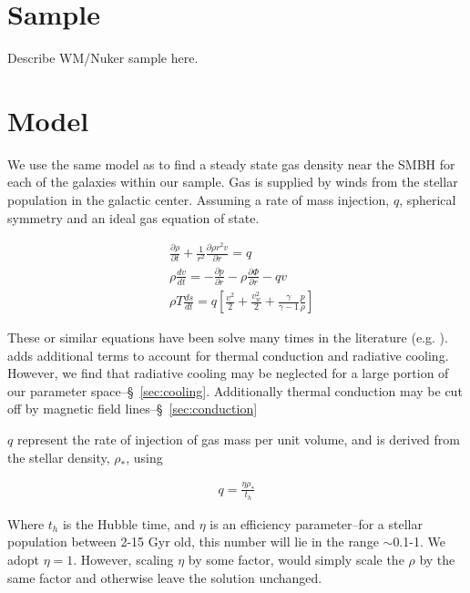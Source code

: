\documentclass[usenatbib,fleqn]{mn2e}
\newcommand{\dxdy}[2]{\frac{\partial #1}{\partial #2} }
\newcommand{\drhodt}{\dxdy{\rho}{t}}
\newcommand{\dpdr}{\dxdy{p}{r}}
\newcommand{\dphidr}{\dxdy{\Phi}{r}}
\newcommand{\ke}{\frac{v^2}{2}}
\newcommand{\kew}{\frac{v_w^2}{2}}
\newcommand{\gammaf}{\frac{\gamma}{\gamma-1}}
\newcommand{\cs}{\frac{p}{\rho}}
\begin{document}


\section{Sample}
Describe WM/Nuker sample here.

\section{Model}
We use the same model as \citealt{Quataert:2004a} to find a steady state gas density near the SMBH for each of the galaxies within our sample.  Gas is supplied by winds from the stellar population in the galactic center. Assuming a rate of mass injection, $q$, spherical symmetry and an ideal gas equation of state. 

\begin{align}
&\drhodt+\frac{1}{r^2}\dxdy{\rho r^2 v}{r}=q\\
&\rho \frac{dv}{dt}=-\dpdr-\rho \dphidr-q v\\
&\rho T \frac{ds}{dt}=q\left[\ke+\kew+\gammaf \cs \right]
\end{align}

These or similar equations have been solve many times in the literature (e.g. \citealt{HolzerAxford:1970a,Quataert:2004a,De-ColleGuillochon+:2012a,ShcherbakovWong+:2014a}). \citealt{ShcherbakovWong+:2014a} adds additional terms to account for thermal conduction and radiative cooling. However, we find that radiative cooling may be neglected for a large portion of our parameter space--\S~\ref{sec:cooling}.  Additionally thermal conduction may be cut off by magnetic field lines--\S~\ref{sec:conduction}

$q$ represent the rate of injection of gas mass per unit volume, and is derived from the stellar density, $\rho_*$, using

\begin{align}
q=\frac{\eta \rho_*}{t_h}
\end{align}

Where $t_h$ is the Hubble time, and $\eta$ is an efficiency parameter--for a stellar population between 2-15 Gyr old, this 
number will lie in the range $\sim$0.1-1. We adopt $\eta=1$. However, scaling $\eta$ by some factor, would simply scale the $\rho$ by the same factor and otherwise leave the solution unchanged.
\end{document}
